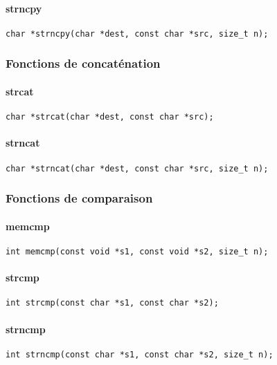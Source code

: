 \paragraph{strncpy}

\begin{Verbatim}
char *strncpy(char *dest, const char *src, size_t n);
\end{Verbatim}

\subsubsection{Fonctions de concaténation}

\paragraph{strcat}
\begin{Verbatim}
char *strcat(char *dest, const char *src);
\end{Verbatim}
\paragraph{strncat}
\begin{Verbatim}
char *strncat(char *dest, const char *src, size_t n);
\end{Verbatim}

\subsubsection{Fonctions de comparaison}

\paragraph{memcmp}
\begin{Verbatim}
int memcmp(const void *s1, const void *s2, size_t n);
\end{Verbatim}
\paragraph{strcmp}
\begin{Verbatim}
int strcmp(const char *s1, const char *s2);
\end{Verbatim}
\paragraph{strncmp}
\begin{Verbatim}
int strncmp(const char *s1, const char *s2, size_t n);
\end{Verbatim}
